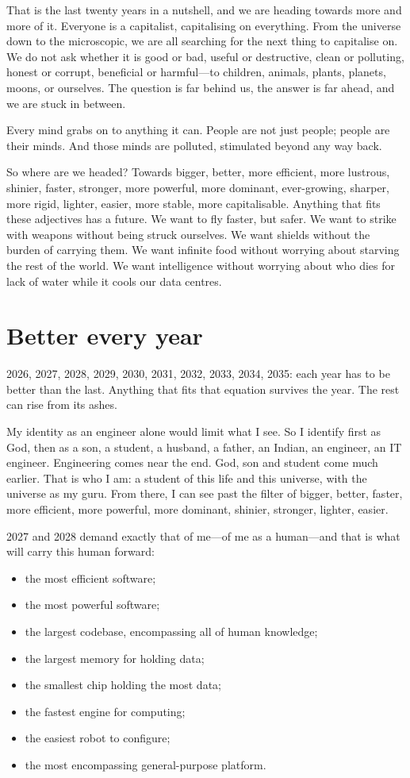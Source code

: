 \documentclass[11pt,a4paper]{article}
\begin{document}
That is the last twenty years in a nutshell, and we are heading towards more
and more of it. Everyone is a capitalist, capitalising on everything. From the
universe down to the microscopic, we are all searching for the next thing to
capitalise on. We do not ask whether it is good or bad, useful or destructive,
clean or polluting, honest or corrupt, beneficial or harmful---to children,
animals, plants, planets, moons, or ourselves. The question is far behind us,
the answer is far ahead, and we are stuck in between.

Every mind grabs on to anything it can. People are not just people; people
are their minds. And those minds are polluted, stimulated beyond any way back.

So where are we headed? Towards bigger, better, more efficient, more lustrous,
shinier, faster, stronger, more powerful, more dominant, ever-growing, sharper,
more rigid, lighter, easier, more stable, more capitalisable. Anything that
fits these adjectives has a future. We want to fly faster, but safer. We want
to strike with weapons without being struck ourselves. We want shields without
the burden of carrying them. We want infinite food without worrying about
starving the rest of the world. We want intelligence without worrying about
who dies for lack of water while it cools our data centres.

\section*{Better every year}

2026, 2027, 2028, 2029, 2030, 2031, 2032, 2033, 2034, 2035: each year has to
be better than the last. Anything that fits that equation survives the year.
The rest can rise from its ashes.

My identity as an engineer alone would limit what I see. So I identify first
as God, then as a son, a student, a husband, a father, an Indian, an engineer,
an IT engineer. Engineering comes near
the end. God, son and student come much earlier. That is who I am: a student
of this life and this universe, with the universe as my guru. From there, I
can see past the filter of bigger, better, faster, more efficient, more
powerful, more dominant, shinier, stronger, lighter, easier.

2027 and 2028 demand exactly that of me---of me as a human---and that is
what will carry this human forward:

\begin{itemize}[leftmargin=1.5em, itemsep=0.1em]
  \item the most efficient software;
  \item the most powerful software;
  \item the largest codebase, encompassing all of human knowledge;
  \item the largest memory for holding data;
  \item the smallest chip holding the most data;
  \item the fastest engine for computing;
  \item the easiest robot to configure;
  \item the most encompassing general-purpose platform.
\end{itemize}
\end{document}
